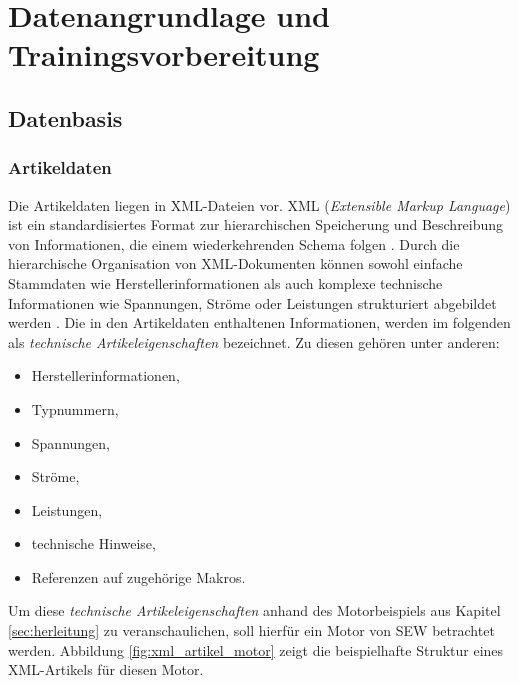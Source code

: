 \chapter{Datenangrundlage und Trainingsvorbereitung} 
\label{chap:datenangrundlage_und_trainingsvorbereitung} 

\section{Datenbasis} 

\subsection{Artikeldaten}
\label{sec:artikeldaten} 

Die Artikeldaten liegen in XML-Dateien vor. 
XML (\textit{Extensible Markup Language}) ist ein standardisiertes Format zur hierarchischen Speicherung und Beschreibung von Informationen, die einem wiederkehrenden Schema folgen \cite{bray2008xml}.
Durch die hierarchische Organisation von XML-Dokumenten können sowohl einfache Stammdaten wie Herstellerinformationen als auch komplexe technische Informationen wie Spannungen, 
Ströme oder Leistungen strukturiert abgebildet werden \cite{bray2008xml}.
Die in den Artikeldaten enthaltenen Informationen, werden im folgenden als \textit{technische Artikeleigenschaften} bezeichnet. 
Zu diesen gehören unter anderen:

\begin{itemize} 
    \item Herstellerinformationen, 
    \item Typnummern, 
    \item Spannungen, 
    \item Ströme, 
    \item Leistungen,  
    \item technische Hinweise, 
    \item Referenzen auf zugehörige Makros. 
\end{itemize} 

Um diese \textit{technische Artikeleigenschaften} anhand des Motorbeispiels aus Kapitel \ref{sec:herleitung} zu veranschaulichen, soll hierfür ein Motor von SEW betrachtet werden.
Abbildung \ref{fig:xml_artikel_motor} zeigt die beispielhafte Struktur eines XML-Artikels für diesen Motor.

